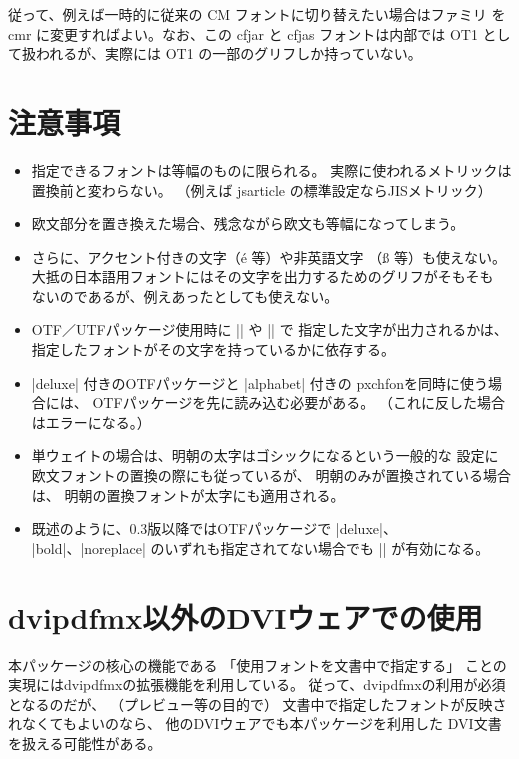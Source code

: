 \documentclass[a4paper,uplatex]{jsarticle}
\newcommand{\Pkg}[1]{\textsf{#1}}
\begin{document}
従って、例えば一時的に従来の CM フォントに切り替えたい場合はファミリ
を cmr に変更すればよい。なお、この cfjar と cfjas フォントは内部では
OT1 として扱われるが、実際には OT1 の一部のグリフしか持っていない。

\section{注意事項}

\begin{itemize}
\item 指定できるフォントは等幅のものに限られる。
  実際に使われるメトリックは置換前と変わらない。
  （例えば jsarticle の標準設定ならJISメトリック）
\item 欧文部分を置き換えた場合、残念ながら欧文も等幅になってしまう。
\item さらに、アクセント付きの文字（\'e 等）や非英語文字
  （{\ss} 等）も使えない。
  大抵の日本語用フォントにはその文字を出力するためのグリフがそもそも
  ないのであるが、例えあったとしても使えない。
\item \Pkg{OTF}／\Pkg{UTF}パッケージ使用時に |\UTF| や |\CID| で
  指定した文字が出力されるかは、
  指定したフォントがその文字を持っているかに依存する。
\item |deluxe| 付きの\Pkg{OTF}パッケージと |alphabet| 付きの
  \Pkg{pxchfon}を同時に使う場合には、
  \Pkg{OTF}パッケージを先に読み込む必要がある。
  （これに反した場合はエラーになる。）
\item 単ウェイトの場合は、明朝の太字はゴシックになるという一般的な
  設定に欧文フォントの置換の際にも従っているが、
  明朝のみが置換されている場合は、
  明朝の置換フォントが太字にも適用される。
\item 既述のように、0.3版以降では\Pkg{OTF}パッケージで |deluxe|、
  |bold|、|noreplace| のいずれも指定されてない場合でも |\setgothicfont|
  が有効になる。
\end{itemize}

\appendix
\section{dvipdfmx以外のDVIウェアでの使用}

本パッケージの核心の機能である
「使用フォントを文書中で指定する」
ことの実現にはdvipdfmxの拡張機能を利用している。
従って、dvipdfmxの利用が必須となるのだが、
（プレビュー等の目的で）
文書中で指定したフォントが反映されなくてもよいのなら、
他のDVIウェアでも本パッケージを利用した
DVI文書を扱える可能性がある。
\end{document}
